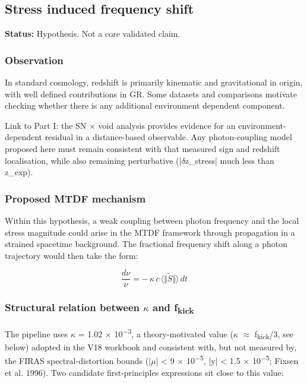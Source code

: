 \documentclass[11pt,a4paper]{article}
\begin{document}
\subsection{Stress induced frequency shift}
\begin{mdframed}[linecolor=accent,linewidth=0.5pt,backgroundcolor=callout-bg,leftline=true,rightline=true,topline=true,bottomline=true,innerleftmargin=8pt,innerrightmargin=8pt,innertopmargin=6pt,innerbottommargin=6pt]
\textbf{Status:} Hypothesis. Not a core validated claim.
\end{mdframed}

\subsubsection{Observation}
In standard cosmology, redshift is primarily kinematic and gravitational in origin, with well defined contributions in GR. Some datasets and comparisons motivate checking whether there is any additional environment dependent component.

Link to Part I: the SN $\times$ void analysis provides evidence for an environment-dependent residual in a distance-based observable. Any photon-coupling model proposed here must remain consistent with that measured sign and redshift localisation, while also remaining perturbative (|$\delta$z\_\allowbreak{}stress| much less than z\_\allowbreak{}exp).

\subsubsection{Proposed MTDF mechanism}
Within this hypothesis, a weak coupling between photon frequency and the local stress magnitude could arise in the MTDF framework through propagation in a strained spacetime background. The fractional frequency shift along a photon trajectory would then take the form:

$$
\frac{d\nu}{\nu} = -\,\kappa\,c\,\langle \Vert \tilde{S}\Vert\rangle\,dt
$$

\subsubsection{Structural relation between $\kappa$ and f\textsubscript{kick}}
The pipeline uses $\kappa$ = 1.02 $\times$ 10\textsuperscript{$-$3}, a theory-motivated value ($\kappa$ $\approx$ f\textsubscript{kick}/3, see below) adopted in the V18 workbook and consistent with, but not measured by, the FIRAS spectral-distortion bounds (|$\mu$| < 9 $\times$ 10\textsuperscript{$-$5}, |y| < 1.5 $\times$ 10\textsuperscript{$-$5}; Fixsen et al. 1996). Two candidate first-principles expressions sit close to this value:
\end{document}
